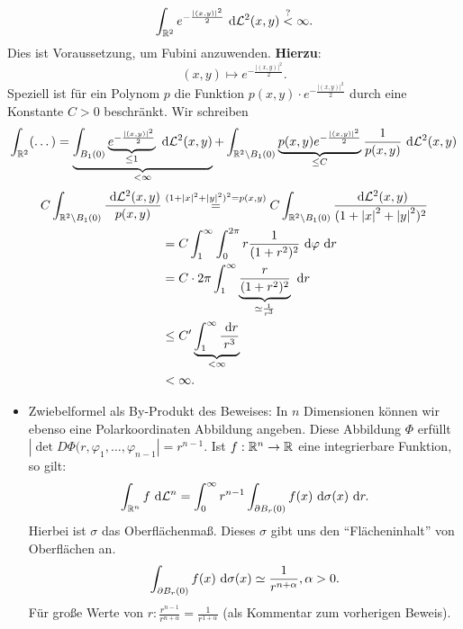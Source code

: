 \[
	\int _{\mathbb{R} ^2} e ^{- \frac{\left| (x, y) \right| ^2}{ 2 } } ~\text{d} \mathcal{L} ^2 (x, y) \overset{?}{<}\infty.
\]
Dies ist Voraussetzung, um Fubini anzuwenden.
\textbf{Hierzu}:
\[
	(x, y) \mapsto e ^{- \frac{ \left| (x, y) \right| ^2 }{ 2 } } .
\]
Speziell ist für ein Polynom $ p  $ die Funktion $ p (x, y) \cdot e ^{ - \frac{ \left| ( x, y ) \right|^2 }{ 2 } }  $ durch eine Konstante $ C > 0 $ beschränkt.
Wir schreiben
\[
	\int _{\mathbb{R} ^2} (\dotsc) = \underbrace{\int _{B_1(0)} \underbrace{e ^{- \frac{ \left| (x, y) \right| ^2 }{ 2 } }}_{\leq 1} ~\text{d} \mathcal{L} ^2 (x, y)}_{< \infty}  + \int _{\mathbb{R} ^2 \setminus B_1(0)} \underbrace{p(x, y) e ^{- \frac{ \left| (x, y) \right| ^2 }{ 2 } }}_{\leq C}  \frac{ 1 }{ p(x, y) } ~\text{d} \mathcal{L} ^2 (x, y)
\]
\begin{align*}
	C \int _{\mathbb{R} ^2 \setminus B_1(0)} \frac{~\text{d} \mathcal{L}^2 (x, y)}{ p (x, y) } &\overset{(1 + \left| x \right| ^2 + \left| y \right| ^2)^2 = p(x, y)}{=} C \int _{\mathbb{R} ^2 \setminus B_1(0)} \frac{ ~\text{d} \mathcal{L} ^2 (x, y) }{ (1 + \left| x \right| ^2 + \left| y \right| ^2)^2 } \\
	~ &= C \int_{1}^{\infty} \int_{0}^{2 \pi } r \frac{ 1 }{ (1 + r^2)^2 } ~\text{d} \varphi ~\text{d} r \\
	~ &= C \cdot 2 \pi \int_{1}^{\infty} \underbrace{\frac{ r }{ ( 1 + r^2)^2 }}_{\simeq \frac{ 1 }{ r^3 } }  ~\text{d} r  \\
	~ & \leq C^\prime \underbrace{\int_{1}^{\infty} \frac{ ~\text{d} r }{ r^3 } }_{< \infty} \\
	~ &< \infty.
\end{align*}

\begin{itemize}
	\item Zwiebelformel als By-Produkt des Beweises:
		In $ n $ Dimensionen können wir ebenso eine Polarkoordinaten Abbildung angeben.
		Diese Abbildung $ \Phi $ erfüllt $ \left| \det D \Phi (r, \varphi_1, \dotsc, \varphi_{n - 1}  \right| = r^{n - 1} $.
		Ist $ f : \mathbb{R} ^n \to \mathbb{R}  $ eine integrierbare Funktion, so gilt:
		\[
			\int _{\mathbb{R} ^n} f ~\text{d} \mathcal{L} ^n = \int_{0}^{\infty} r^{n - 1} \int _{\partial B_r(0)} f(x) ~\text{d} \sigma (x) ~\text{d} r.
		\]
		Hierbei ist $ \sigma $ das Oberflächenmaß.
		Dieses $ \sigma $ gibt uns den ``Flächeninhalt'' von Oberflächen an.
		\[
			\int _{\partial B_r(0)} f(x) ~\text{d} \sigma (x) \simeq \frac{ 1 }{ r^{n + \alpha}  } , \alpha > 0.
		\]
		Für große Werte von $ r : \frac{ r^{n - 1} }{ r ^{n + \alpha}  } = \frac{ 1 }{ r^{1 + \alpha}  }  $ (als Kommentar zum vorherigen Beweis).
\end{itemize}

